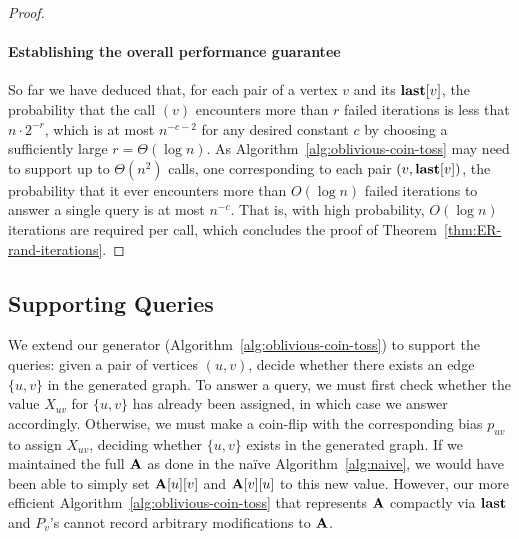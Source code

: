 \begin{proof}
\paragraph*{Establishing the overall performance guarantee}
So far we have deduced that, for each pair of a vertex $v$ and its $\mathbf{last}[v]$, the probability that the call $(v)$ encounters more than $r$ failed iterations is less that $n \cdot 2^{-r}$, which is at most $n^{-c-2}$ for any desired constant $c$ by choosing a sufficiently large $r = \Theta(\log n)$. As Algorithm~\ref{alg:oblivious-coin-toss} may need to support up to $\Theta(n^2)$  calls, one corresponding to each pair $(v, \mathbf{last}[v])$, the probability that it ever encounters more than $O(\log n)$  failed iterations to answer a single  query is at most $n^{-c}$. That is, with high probability, $O(\log n)$ iterations are required per  call, which concludes the proof of Theorem~\ref{thm:ER-rand-iterations}.
\end{proof}

\subsection{Supporting  Queries} \label{sec:ER-pair}

We extend our generator (Algorithm~\ref{alg:oblivious-coin-toss}) to support the  queries: given a pair of vertices $(u, v)$, decide whether there exists an edge $\{u, v\}$ in the generated graph. To answer a  query, we must first check whether the value $X_{uv}$ for $\{u, v\}$ has already been assigned, in which case we answer accordingly. Otherwise, we must make a coin-flip with the corresponding bias $p_{uv}$ to assign $X_{uv}$, deciding whether $\{u, v\}$ exists in the generated graph. If we maintained the full $\mathbf{A}$ as done in the na\"{i}ve Algorithm~\ref{alg:naive}, we would have been able to simply set $\mathbf{A}[u][v]$ and $\mathbf{A}[v][u]$ to this new value. However, our more efficient Algorithm~\ref{alg:oblivious-coin-toss} that represents $\mathbf{A}$ compactly via $\mathbf{last}$ and $P_v$'s cannot record arbitrary modifications to $\mathbf{A}$.

